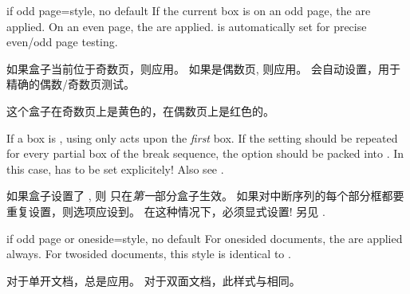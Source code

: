 \begin{docTcbKey}[][doc new=2015-11-13]{if odd page}{=}{style, no default}
 If the current box is on an odd page, the  are applied.
 On an even page, the  are applied.
  is automatically set for precise even/odd page testing.

如果盒子当前位于奇数页，则应用。%
如果是偶数页, 则应用。%
会自动设置，用于精确的偶数/奇数页测试。

\begin{dispExample}
\begin{tcolorbox}[if odd page={colback=yellow!50}{colback=red!50}]
这个盒子在奇数页上是黄色的，在偶数页上是红色的。
\end{tcolorbox}
\end{dispExample}

\begin{marker}
 If a box is , using 
 only acts upon the \emph{first} box. If the setting should be
 repeated for every partial box of the break sequence, the option should be
 packed into . In this case, 
 has to be set explicitely! Also see .

如果盒子设置了 , 则  只在\emph{第一}部分盒子生效。%
如果对中断序列的每个部分框都要重复设置，则选项应设到。%
在这种情况下，必须显式设置! 另见 .
\end{marker}
\end{docTcbKey}




\begin{docTcbKey}[][doc new=2016-11-18]{if odd page or oneside}{=}{style, no default}
 For onesided documents, the  are applied always.
 For twosided documents, this style is identical to .

对于单开文档，总是应用。%
对于双面文档，此样式与相同。
\end{docTcbKey}

